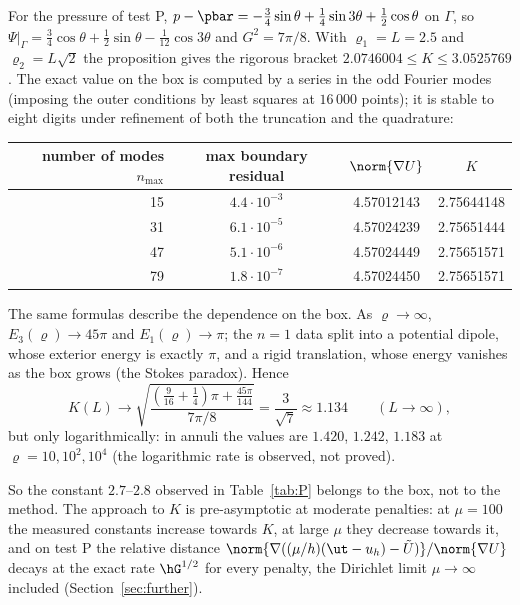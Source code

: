 For the pressure of test P, $p-\pbar=-\frac34\sin\theta+\frac14\sin3\theta+\frac12\cos\theta$ on $\Gamma$, so $\Psi|_\Gamma=\frac34\cos\theta+\frac12\sin\theta-\frac1{12}\cos3\theta$ and $G^2=7\pi/8$. With $\varrho_1=L=2.5$ and $\varrho_2=L\sqrt2$ the proposition gives the rigorous bracket $2.0746004\le K\le3.0525769$. The exact value on the box is computed by a series in the odd Fourier modes (imposing the outer conditions by least squares at $16\,000$ points); it is stable to eight digits under refinement of both the truncation and the quadrature:
\begin{center}\small
\begin{tabular}{rccc}
\toprule
number of modes $n_{\max}$ & max boundary residual & $\norm{\nabla U}$ & $K$\\
\midrule
15 & $4.4\cdot10^{-3}$ & 4.57012143 & 2.75644148\\
31 & $6.1\cdot10^{-5}$ & 4.57024239 & 2.75651444\\
47 & $5.1\cdot10^{-6}$ & 4.57024449 & 2.75651571\\
79 & $1.8\cdot10^{-7}$ & 4.57024450 & 2.75651571\\
\bottomrule
\end{tabular}
\end{center}
The same formulas describe the dependence on the box. As $\varrho\to\infty$, $E_3(\varrho)\to45\pi$ and $E_1(\varrho)\to\pi$; the $n=1$ data split into a potential dipole, whose exterior energy is exactly $\pi$, and a rigid translation, whose energy vanishes as the box grows (the Stokes paradox). Hence
\[
K(L)\longrightarrow\sqrt{\frac{(\frac9{16}+\frac14)\pi+\frac{45\pi}{144}}{7\pi/8}}=\frac3{\sqrt7}\approx1.134\qquad(L\to\infty),
\]
but only logarithmically: in annuli the values are $1.420$, $1.242$, $1.183$ at $\varrho=10,10^2,10^4$ (the logarithmic rate is observed, not proved).

So the constant $2.7$--$2.8$ observed in Table~\ref{tab:P} belongs to the box, not to the method. The approach to $K$ is pre-asymptotic at moderate penalties: at $\mu=100$ the measured constants increase towards $K$, at large $\mu$ they decrease towards it, and on test P the relative distance $\norm{\nabla((\mu/h)(\ut-u_h)-\tilde U)}/\norm{\nabla U}$ decays at the exact rate $\hG^{1/2}$ for every penalty, the Dirichlet limit $\mu\to\infty$ included (Section~\ref{sec:further}).
